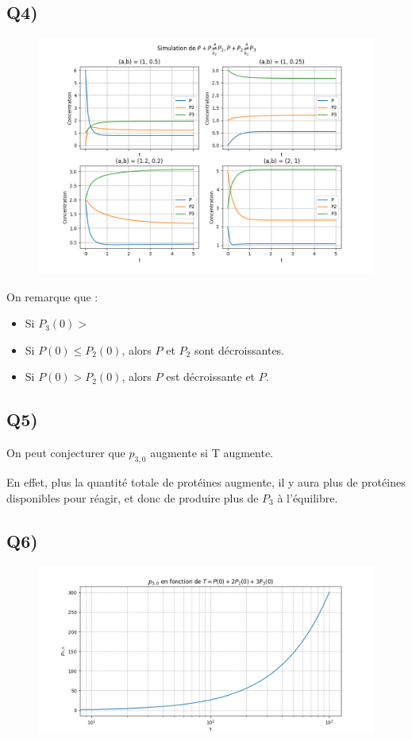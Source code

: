 \documentclass[12pt,a4paper]{article}
\begin{document}
\newpage
\subsection*{Q4)}
\begin{figure}[h!]
	\includegraphics[scale=0.6]{"graph_ex1_q4.png"}
\end{figure}
On remarque que :
\begin{itemize}
\item Si $P_3(0) > $
\item Si $P(0) \leq P_2(0)$, alors $P$ et $P_2$ sont décroissantes.
\item Si $P(0) > P_2(0)$, alors $P$ est décroissante et $P$.
\end{itemize}

\subsection*{Q5)}

On peut conjecturer que $p_{3,0}$ augmente si T augmente. 

En effet, plus la quantité totale de protéines augmente, il y aura plus de protéines disponibles pour réagir, et donc de produire plus de $P_3$ à l'équilibre.

\newpage
\subsection*{Q6)}
\begin{figure}[h!]
	\includegraphics[scale=0.6]{"graph_ex1_q6.png"}
\end{figure}
\end{document}
